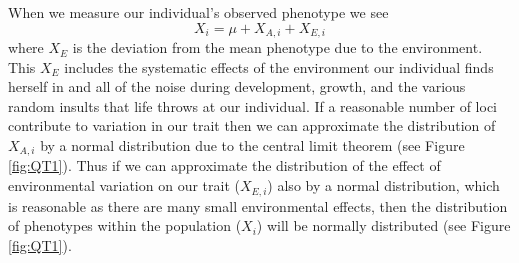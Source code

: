 When we measure our individual's observed phenotype we see
\begin{equation}
X_i =   \mu+X_{A,i} + X_{E,i} \label{pheno_geno_environ}
\end{equation}
where $X_E$ is the deviation from the mean phenotype due to the
environment. This $X_E$ includes the systematic effects of the environment
our individual finds herself in and all of the noise during
development, growth, and the various random insults that life throws
at our individual. If a reasonable number of loci contribute to
variation in our trait then we can approximate the distribution of
$X_{A,i}$ by a normal distribution due to the central limit theorem
(see Figure \ref{fig:QT1}).  Thus if we can
approximate the distribution of the effect of environmental variation
on our trait ($X_{E,i}$) also by a normal distribution, which is
reasonable as there are many small environmental effects, then the
distribution of phenotypes within the population ($X_i$) will be
normally distributed (see Figure \ref{fig:QT1}).\\

